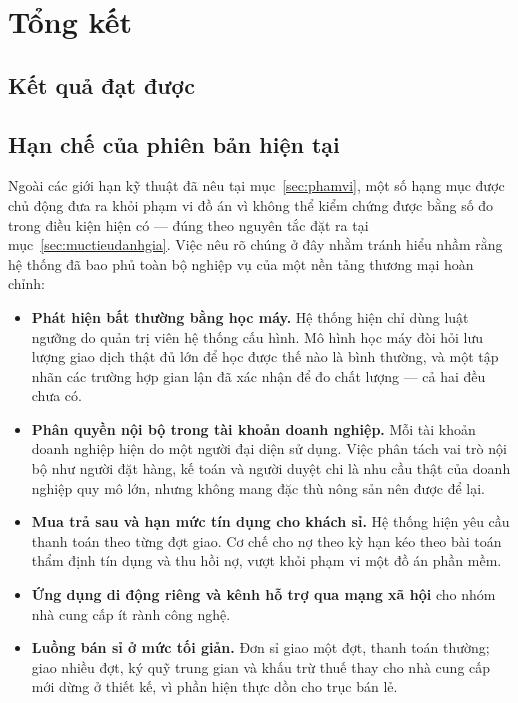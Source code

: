 \chapter{Tổng kết}
\label{chap:ketluan}

\section{Kết quả đạt được}

\section{Hạn chế của phiên bản hiện tại}

Ngoài các giới hạn kỹ thuật đã nêu tại mục~\ref{sec:phamvi}, một số hạng mục được chủ động đưa ra khỏi phạm vi đồ án vì không thể kiểm chứng được bằng số đo trong điều kiện hiện có --- đúng theo nguyên tắc đặt ra tại mục~\ref{sec:muctieudanhgia}. Việc nêu rõ chúng ở đây nhằm tránh hiểu nhầm rằng hệ thống đã bao phủ toàn bộ nghiệp vụ của một nền tảng thương mại hoàn chỉnh:

\begin{itemize}
    \item \textbf{Phát hiện bất thường bằng học máy.} Hệ thống hiện chỉ dùng luật ngưỡng do quản trị viên hệ thống cấu hình. Mô hình học máy đòi hỏi lưu lượng giao dịch thật đủ lớn để học được thế nào là bình thường, và một tập nhãn các trường hợp gian lận đã xác nhận để đo chất lượng --- cả hai đều chưa có.
    \item \textbf{Phân quyền nội bộ trong tài khoản doanh nghiệp.} Mỗi tài khoản doanh nghiệp hiện do một người đại diện sử dụng. Việc phân tách vai trò nội bộ như người đặt hàng, kế toán và người duyệt chi là nhu cầu thật của doanh nghiệp quy mô lớn, nhưng không mang đặc thù nông sản nên được để lại.
    \item \textbf{Mua trả sau và hạn mức tín dụng cho khách sỉ.} Hệ thống hiện yêu cầu thanh toán theo từng đợt giao. Cơ chế cho nợ theo kỳ hạn kéo theo bài toán thẩm định tín dụng và thu hồi nợ, vượt khỏi phạm vi một đồ án phần mềm.
    \item \textbf{Ứng dụng di động riêng và kênh hỗ trợ qua mạng xã hội} cho nhóm nhà cung cấp ít rành công nghệ.
    \item \textbf{Luồng bán sỉ ở mức tối giản.} Đơn sỉ giao một đợt, thanh toán thường; giao nhiều đợt, ký quỹ trung gian và khấu trừ thuế thay cho nhà cung cấp mới dừng ở thiết kế, vì phần hiện thực dồn cho trục bán lẻ.
\end{itemize}

